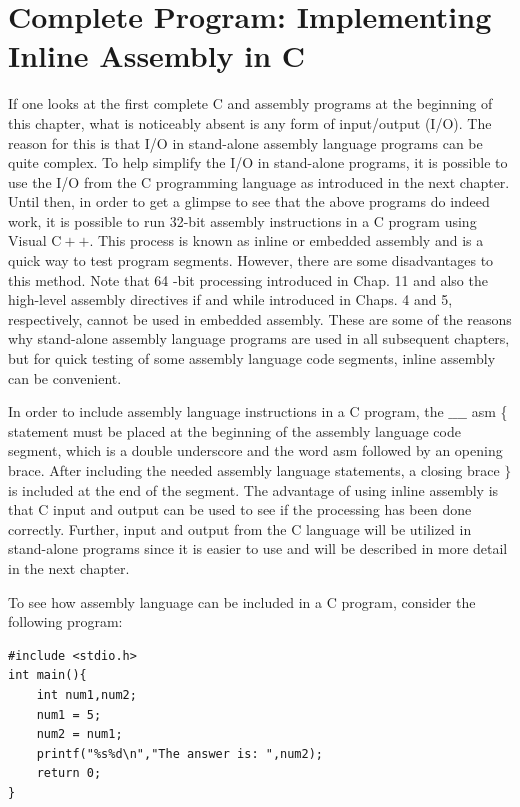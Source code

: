 \documentclass[10pt]{book}
\begin{document}
\section{Complete Program: Implementing Inline Assembly in C}
If one looks at the first complete C and assembly programs at the beginning of this chapter, what is noticeably absent is any form of input/output (I/O). The reason for this is that I/O in stand-alone assembly language programs can be quite complex. To help simplify the I/O in stand-alone programs, it is possible to use the I/O from the C programming language as introduced in the next chapter. Until then, in order to get a glimpse to see that the above programs do indeed work, it is possible to run 32-bit assembly instructions in a C program using Visual $\mathrm{C}++$. This process is known as inline or embedded assembly and is a quick way to test program segments. However, there are some disadvantages to this method. Note that 64 -bit processing introduced in Chap. 11 and also the high-level assembly directives if and while introduced in Chaps. 4 and 5, respectively, cannot be used in embedded assembly. These are some of the reasons why stand-alone assembly language programs are used in all subsequent chapters, but for quick testing of some assembly language code segments, inline assembly can be convenient.

In order to include assembly language instructions in a C program, the $\_\_\_\_$ asm \{ statement must be placed at the beginning of the assembly language code segment, which is a double underscore and the word asm followed by an opening brace. After including the needed assembly language statements, a closing brace $\}$ is included at the end of the segment. The advantage of using inline assembly is that C input and output can be used to see if the processing has been done correctly. Further, input and output from the C language will be utilized in stand-alone programs since it is easier to use and will be described in more detail in the next chapter.


To see how assembly language can be included in a C program, consider the following program:

\begin{verbatim}
#include <stdio.h>
int main(){
    int num1,num2;
    num1 = 5;
    num2 = num1;
    printf("%s%d\n","The answer is: ",num2);
    return 0;
}
\end{verbatim}
\end{document}
